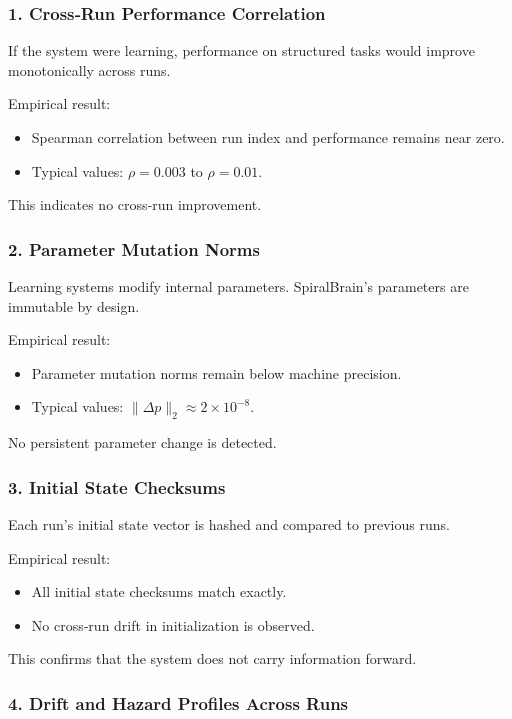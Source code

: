 \documentclass[12pt,a4paper]{report}
\begin{document}
\subsubsection{1. Cross‑Run Performance Correlation}

If the system were learning, performance on structured tasks would improve monotonically across runs.

Empirical result:  
\begin{itemize}
\item Spearman correlation between run index and performance remains near zero.  
\item Typical values: \( \rho = 0.003 \) to \( \rho = 0.01 \).  
\end{itemize}

This indicates no cross‑run improvement.

\subsubsection{2. Parameter Mutation Norms}

Learning systems modify internal parameters. SpiralBrain’s parameters are immutable by design.

Empirical result:  
\begin{itemize}
\item Parameter mutation norms remain below machine precision.  
\item Typical values: \( \|\Delta p\|_2 \approx 2 \times 10^{-8} \).  
\end{itemize}

No persistent parameter change is detected.

\subsubsection{3. Initial State Checksums}

Each run’s initial state vector is hashed and compared to previous runs.

Empirical result:  
\begin{itemize}
\item All initial state checksums match exactly.  
\item No cross‑run drift in initialization is observed.
\end{itemize}

This confirms that the system does not carry information forward.

\subsubsection{4. Drift and Hazard Profiles Across Runs}
\end{document}
